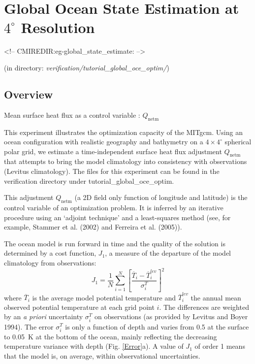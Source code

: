 
\section[Global Ocean State Estimation Example]{Global Ocean State Estimation at $4^\circ$ Resolution}
\label{www:tutorials}
\label{sect:eg-global_state_estimate}
\begin{rawhtml}
<!-- CMIREDIR:eg-global_state_estimate: -->
\end{rawhtml}
\begin{center}
(in directory: {\it verification/tutorial\_global\_oce\_optim/})
\end{center}

\subsection{Overview}

Mean surface heat flux as a  control variable : $Q_\mathrm{netm}$

This experiment illustrates the optimization capacity of the MITgcm.
Using an ocean configuration with realistic geography and bathymetry on a
$4\times4^\circ$ spherical polar grid, we estimate a time-independent surface
heat flux adjustment $Q_\mathrm{netm}$ that attempts to bring the model
climatology into consistency with observations (Levitus climatology).
The files for this experiment can be found in the verification directory under
tutorial\_global\_oce\_optim.

This adjustment $Q_\mathrm{netm}$ (a 2D field only function of longitude and
latitude) is the control variable of an optimization problem. It is inferred
by an iterative procedure using an `adjoint technique' and a least-squares
method (see, for example, Stammer et al. (2002) and Ferreira et al. (2005)).

The ocean model is run forward in time and the quality of the solution is
determined by a cost function, $J_1$, a measure of the departure of the model
climatology from observations:
\begin{equation}
J_1=\frac{1}{N}\sum_{i=1}^N \left[ \frac{\overline{T}_i-\overline{T}_i^{lev}}{\sigma_i^T}\right]^2
\end{equation}
where $\overline{T}_i$ is the average model potential temperature and
$\overline{T}_i^{lev}$ the annual mean observed potential temperature at each
grid point $i$. The differences are weighted by an {\it a priori} uncertainty
$\sigma_i^T$ on observations (as provided by Levitus and Boyer 1994). The error
$\sigma_i^T$ is only a function of depth and varies from 0.5 at the surface to
0.05~K at the bottom of the ocean, mainly reflecting the decreasing
temperature variance with depth (Fig. \ref{Error}a). A value of $J_1$ of
order 1 means that the model is, on average, within observational
uncertainties.

